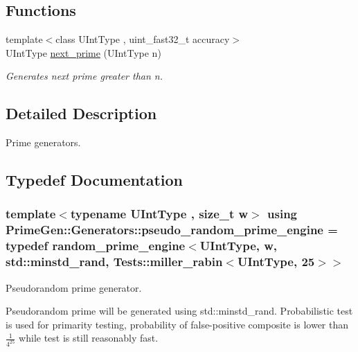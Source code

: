 \subsection*{Functions}
\begin{DoxyCompactItemize}
\item 
{\footnotesize template$<$class U\+Int\+Type , uint\+\_\+fast32\+\_\+t accuracy$>$ }\\U\+Int\+Type \hyperlink{namespace_prime_gen_1_1_generators_a873d71df2a6aa5006ef2be655b0e96bd}{next\+\_\+prime} (U\+Int\+Type n)
\begin{DoxyCompactList}\small\item\em Generates next prime greater than {\ttfamily n}. \end{DoxyCompactList}\end{DoxyCompactItemize}


\subsection{Detailed Description}
Prime generators. 

\subsection{Typedef Documentation}
\hypertarget{namespace_prime_gen_1_1_generators_ab90cf6ac663308b430053823ec13564b}{
\subsubsection[{pseudo\+\_\+random\+\_\+prime\+\_\+engine}]{\setlength{\rightskip}{0pt plus 5cm}template$<$typename U\+Int\+Type , size\+\_\+t w$>$ using {\bf Prime\+Gen\+::\+Generators\+::pseudo\+\_\+random\+\_\+prime\+\_\+engine} = typedef {\bf random\+\_\+prime\+\_\+engine}$<$U\+Int\+Type, w, std\+::minstd\+\_\+rand, {\bf Tests\+::miller\+\_\+rabin}$<$U\+Int\+Type, 25$>$$>$}}\label{namespace_prime_gen_1_1_generators_ab90cf6ac663308b430053823ec13564b}


Pseudorandom prime generator. 

Pseudorandom prime will be generated using {\ttfamily std\+::minstd\+\_\+rand}. Probabilistic test is used for primarity testing, probability of false-\/positive composite is lower than $ \frac{1}{4^{25}} $ while test is still reasonably fast.


